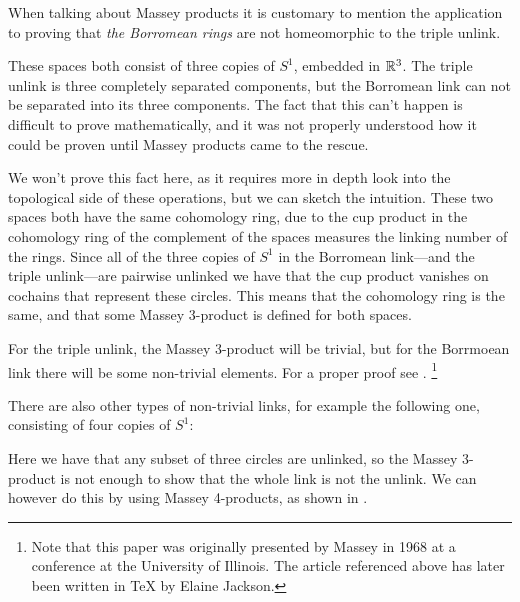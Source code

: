 \begin{example}
\label{ex:borromean_rings}
When talking about Massey products it is customary to mention the application to proving that \emph{the Borromean rings} are not homeomorphic to the triple unlink. 

\begin{center}
\def\svgwidth{0.8\textwidth}

\end{center}

These spaces both consist of three copies of $S^1$, embedded in $\mathbb{R}^3$. The triple unlink is three completely separated components, but the Borromean link can not be separated into its three components. The fact that this can't happen is difficult to prove mathematically, and it was not properly understood how it could be proven until Massey products came to the rescue. 

We won't prove this fact here, as it requires more in depth look into the topological side of these operations, but we can sketch the intuition. These two spaces both have the same cohomology ring, due to the cup product in the cohomology ring of the complement of the spaces measures the linking number of the rings. Since all of the three copies of $S^1$ in the Borromean link---and the triple unlink---are pairwise unlinked we have that the cup product vanishes on cochains that represent these circles. This means that the cohomology ring is the same, and that some Massey $3$-product is defined for both spaces. 

For the triple unlink, the Massey 3-product will be trivial, but for the Borrmoean link there will be some non-trivial elements. For a proper proof see \cite{linking}. \footnote{Note that this paper was originally presented by Massey in 1968 at a conference at the University of Illinois. The article referenced above has later been written in \TeX{} by Elaine Jackson.}
\end{example}

\begin{example}
There are also other types of non-trivial links, for example the following one, consisting of four copies of $S^1$:

\begin{center}
\def\svgwidth{0.7\textwidth}

\end{center}

Here we have that any subset of three circles are unlinked, so the Massey 3-product is not enough to show that the whole link is not the unlink. We can however do this by using Massey 4-products, as shown in \cite{four-link}. 
\end{example}



